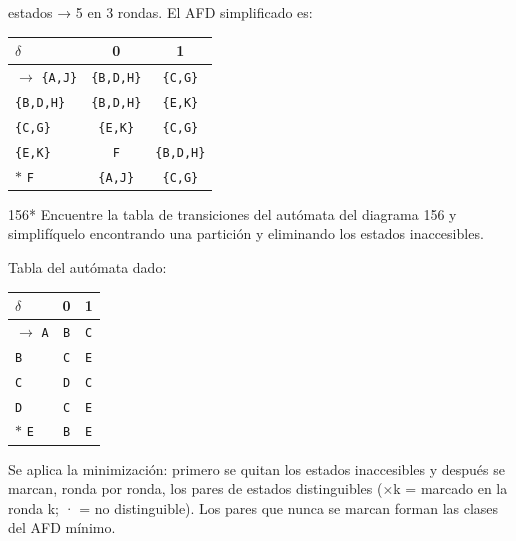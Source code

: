 \documentclass[11pt]{article}
\begin{document}
 estados → 5 en 3 rondas. El AFD simplificado es:
\begin{center}\small\begin{tabular}{lcc}\toprule
$\delta$ & 0 & 1 \\\midrule
$\to$ \texttt{\{A,J\}} & \texttt{\{B,D,H\}} & \texttt{\{C,G\}} \\
 \texttt{\{B,D,H\}} & \texttt{\{B,D,H\}} & \texttt{\{E,K\}} \\
 \texttt{\{C,G\}} & \texttt{\{E,K\}} & \texttt{\{C,G\}} \\
 \texttt{\{E,K\}} & \texttt{F} & \texttt{\{B,D,H\}} \\
$*$ \texttt{F} & \texttt{\{A,J\}} & \texttt{\{C,G\}} \\
\bottomrule\end{tabular}\end{center}



\begin{ejercicio}{156}{*}
Encuentre la tabla de transiciones del autómata del diagrama 156 y simplifíquelo encontrando una partición y eliminando los estados inaccesibles.
\end{ejercicio}
\proc Tabla del autómata dado:
\begin{center}\small\begin{tabular}{lcc}\toprule
$\delta$ & 0 & 1 \\\midrule
$\to$ \texttt{A} & \texttt{B} & \texttt{C} \\
 \texttt{B} & \texttt{C} & \texttt{E} \\
 \texttt{C} & \texttt{D} & \texttt{C} \\
 \texttt{D} & \texttt{C} & \texttt{E} \\
$*$ \texttt{E} & \texttt{B} & \texttt{E} \\
\bottomrule\end{tabular}\end{center}
Se aplica la minimización: primero se quitan los estados inaccesibles y después se marcan, ronda por ronda, los pares de estados distinguibles (×k = marcado en la ronda k; · = no distinguible). Los pares que nunca se marcan forman las clases del AFD mínimo.
\end{document}
